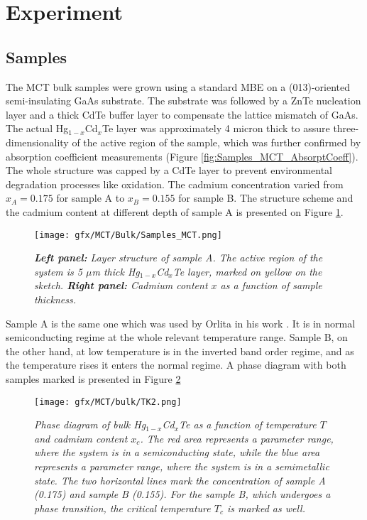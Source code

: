 \documentclass[titlepage,a4paper]{book}
\newcommand{\wciecie}{\quad\phantom{v}}
\begin{document}
\section{Experiment}
\subsection{Samples}
\wciecie
The MCT bulk samples were grown using a standard MBE on a (013)-oriented semi-insulating GaAs substrate. The substrate was followed by a ZnTe nucleation layer and a thick CdTe buffer layer to compensate the lattice mismatch of GaAs. The actual Hg$_{1-x}$Cd$_x$Te layer was approximately 4 micron thick to assure three-dimensionality of the active region of the sample, which was further confirmed by absorption coefficient measurements (Figure \ref{fig:Samples_MCT_AbsorptCoeff}). The whole structure was capped by a CdTe layer to prevent environmental degradation processes like oxidation. The cadmium concentration varied from $x_A = 0.175$ for sample A to $x_B = 0.155$ for sample B.  The structure scheme and the cadmium content at different depth of sample A is presented on Figure \ref{fig:Samples_MCT}. 

\begin{figure}[ht]
	\centering
	\texttt{[image: gfx/MCT/Bulk/Samples\_MCT.png]}
	\vspace{-10pt}
	\caption{\textit{\textbf{Left panel:} Layer structure of sample A. The active region of the system is 5 $\mu$m thick Hg$_{1-x}$Cd$_x$Te layer, marked on yellow on the sketch. \textbf{Right panel:} Cadmium content $x$ as a function of sample thickness.}}
	\label{fig:Samples_MCT}
\end{figure} 

Sample A is the same one which was used by Orlita in his work \cite{Orlita_MCT}. It is in normal semiconducting regime at the whole relevant temperature range. Sample B, on the other hand, at low temperature is in the inverted band order regime, and as the temperature rises it enters the normal regime. A phase diagram with both samples marked is presented in Figure \ref{fig:TK2}

\begin{figure}[H]
	\centering
	\texttt{[image: gfx/MCT/bulk/TK2.png]}
	\vspace{-10pt}
	\caption{\textit{Phase diagram of bulk Hg$_{1-x}$Cd$_x$Te as a function of temperature $T$ and cadmium content $x_c$. The red area represents a parameter range, where the system is in a semiconducting state, while the blue area represents a parameter range, where the system is in a semimetallic state. The two horizontal lines mark the concentration of sample A (0.175) and sample B (0.155). For the sample B, which undergoes a phase transition, the critical temperature $T_c$ is marked as well.}}
	\label{fig:TK2}
\end{figure} 
\end{document}
